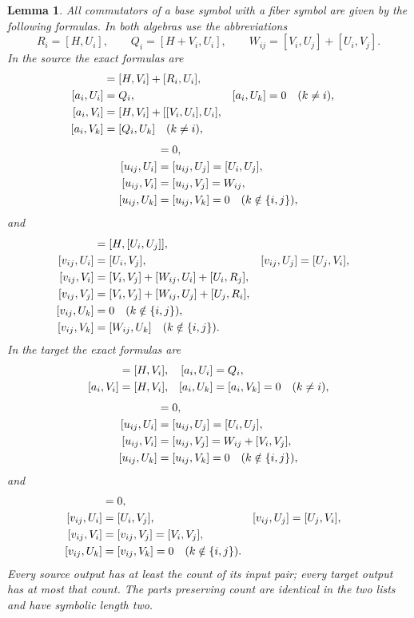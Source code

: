 \documentclass[11pt]{article}
\newtheorem{lemma}[theorem]{Lemma}
\theoremstyle{definition}
\theoremstyle{remark}
\numberwithin{equation}{section}
\begin{document}
\begin{lemma}\label{lem:action-tables}
All commutators of a base symbol with a fiber symbol are given by the
following formulas.  In both algebras use the abbreviations
\[
 R_i=[H,U_i],\qquad Q_i=[H+V_i,U_i],\qquad
 W_{ij}=[V_i,U_j]+[U_i,V_j].
\]
In the source the exact formulas are
\begin{align}
 [a_i,H]&=[H,V_i]+[R_i,U_i],\notag\\
 [a_i,U_i]&=Q_i,& [a_i,U_k]&=0\quad(k\ne i),\notag\\
 [a_i,V_i]&=[H,V_i]+[[V_i,U_i],U_i],\notag\\
 [a_i,V_k]&=[Q_i,U_k]\quad(k\ne i),
 \label{eq:source-a-actions}
\end{align}
\begin{align}
 [u_{ij},H]&=0,\notag\\
 [u_{ij},U_i]&=[u_{ij},U_j]=[U_i,U_j],\notag\\
 [u_{ij},V_i]&=[u_{ij},V_j]=W_{ij},\notag\\
 [u_{ij},U_k]&=[u_{ij},V_k]=0\quad(k\notin\{i,j\}),
 \label{eq:source-u-actions}
\end{align}
and
\begin{align}
 [v_{ij},H]&=[H,[U_i,U_j]],\notag\\
 [v_{ij},U_i]&=[U_i,V_j],&
 [v_{ij},U_j]&=[U_j,V_i],\notag\\
 [v_{ij},V_i]&=[V_i,V_j]+[W_{ij},U_i]+[U_i,R_j],\notag\\
 [v_{ij},V_j]&=[V_i,V_j]+[W_{ij},U_j]+[U_j,R_i],\notag\\
 [v_{ij},U_k]&=0\quad(k\notin\{i,j\}),\notag\\
 [v_{ij},V_k]&=[W_{ij},U_k]\quad(k\notin\{i,j\}).
 \label{eq:source-v-actions}
\end{align}
In the target the exact formulas are
\begin{align}
 [a_i,H]&=[H,V_i],& [a_i,U_i]&=Q_i,\notag\\
 [a_i,V_i]&=[H,V_i],&
 [a_i,U_k]&=[a_i,V_k]=0\quad(k\ne i),
 \label{eq:target-a-actions}
\end{align}
\begin{align}
 [u_{ij},H]&=0,\notag\\
 [u_{ij},U_i]&=[u_{ij},U_j]=[U_i,U_j],\notag\\
 [u_{ij},V_i]&=[u_{ij},V_j]=W_{ij}+[V_i,V_j],\notag\\
 [u_{ij},U_k]&=[u_{ij},V_k]=0\quad(k\notin\{i,j\}),
 \label{eq:target-u-actions}
\end{align}
and
\begin{align}
 [v_{ij},H]&=0,\notag\\
 [v_{ij},U_i]&=[U_i,V_j],&
 [v_{ij},U_j]&=[U_j,V_i],\notag\\
 [v_{ij},V_i]&=[v_{ij},V_j]=[V_i,V_j],\notag\\
 [v_{ij},U_k]&=[v_{ij},V_k]=0\quad(k\notin\{i,j\}).
 \label{eq:target-v-actions}
\end{align}
Every source output has at least the count of its input pair; every
target output has at most that count.  The parts preserving count
are identical in the two lists and have symbolic length two.
\end{lemma}
\end{document}
